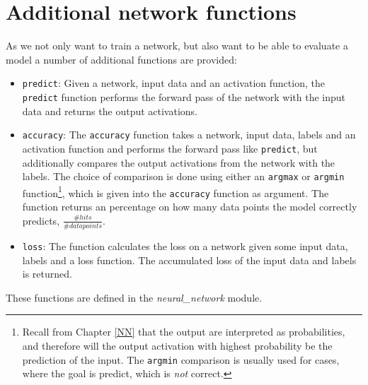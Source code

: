 \section{Additional network functions}
As we not only want to train a network, but also want to be able to evaluate a
model a number of additional functions are provided:
\begin{itemize}
	\item \texttt{predict}: Given a network, input data and an activation function,
	the \texttt{predict} function performs the forward pass of the network with the
	input data and returns the output activations.
	
	\item \texttt{accuracy}: The \texttt{accuracy} function takes a network, input
	data, labels and an activation function and performs the forward pass like
	\texttt{predict}, but additionally compares the output activations from the
	network with the labels. 
	The choice of comparison is done using either an \texttt{argmax} or
	\texttt{argmin} function\footnote{Recall from Chapter \ref{NN} that the output
		are interpreted as probabilities, and therefore will the output activation with
		highest probability be the prediction of the input. 
		The \texttt{argmin} comparison is usually used for cases, where the goal is
		predict, which is \emph{not} correct.}, which is given into the
	\texttt{accuracy} function as argument. 
	The function returns an percentage on how many data points the model correctly
	predicts, $\frac{\#hits}{\# data points}$. 
	
	\item \texttt{loss}: The function calculates the loss on a network given some
	input data, labels and a loss function. The accumulated loss of the input data
	and labels is returned. 
\end{itemize}
These functions are defined in the \emph{neural\_network} module. 


